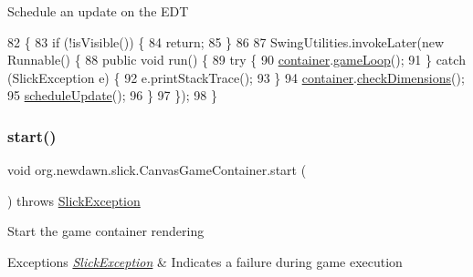 Schedule an update on the E\+DT 
\begin{DoxyCode}
82                                   \{
83         \textcolor{keywordflow}{if} (!isVisible()) \{
84             \textcolor{keywordflow}{return};
85         \}
86         
87         SwingUtilities.invokeLater(\textcolor{keyword}{new} Runnable() \{
88             \textcolor{keyword}{public} \textcolor{keywordtype}{void} run() \{
89                 \textcolor{keywordflow}{try} \{
90                     \mbox{\hyperlink{classorg_1_1newdawn_1_1slick_1_1_canvas_game_container_af13c765d7302dc5948d0261e2526ef8b}{container}}.\mbox{\hyperlink{classorg_1_1newdawn_1_1slick_1_1_app_game_container_a57672732cfac93096300c549103619dd}{gameLoop}}();
91                 \} \textcolor{keywordflow}{catch} (SlickException e) \{
92                     e.printStackTrace();
93                 \}
94                 \mbox{\hyperlink{classorg_1_1newdawn_1_1slick_1_1_canvas_game_container_af13c765d7302dc5948d0261e2526ef8b}{container}}.\mbox{\hyperlink{classorg_1_1newdawn_1_1slick_1_1_canvas_game_container_1_1_container_a23325dcc30cb88191ac8f0382a2fc611}{checkDimensions}}();
95                 \mbox{\hyperlink{classorg_1_1newdawn_1_1slick_1_1_canvas_game_container_a38f91f490299ca036d075779ff15ff15}{scheduleUpdate}}();
96             \}
97         \});
98     \}
\end{DoxyCode}
\mbox{\label{classorg_1_1newdawn_1_1slick_1_1_canvas_game_container_a4649e692eacd83dfb7fe5cf2c383dd39}} 
\subsubsection{\texorpdfstring{start()}{start()}}
{\footnotesize\ttfamily void org.\+newdawn.\+slick.\+Canvas\+Game\+Container.\+start (\begin{DoxyParamCaption}{ }\end{DoxyParamCaption}) throws \mbox{\hyperlink{classorg_1_1newdawn_1_1slick_1_1_slick_exception}{Slick\+Exception}}\hspace{0.3cm}{\ttfamily [inline]}}

Start the game container rendering


\begin{DoxyExceptions}{Exceptions}
{\em \mbox{\hyperlink{classorg_1_1newdawn_1_1slick_1_1_slick_exception}{Slick\+Exception}}} & Indicates a failure during game execution \\
\hline
\end{DoxyExceptions}

